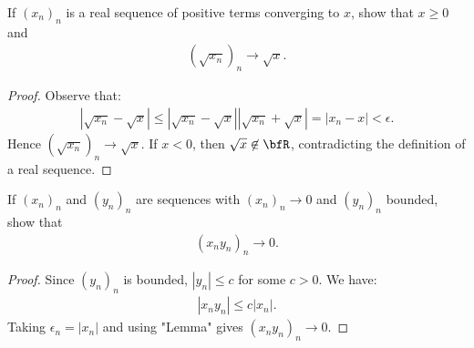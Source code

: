\documentclass[10pt,twoside,openany]{memoir}
\begin{document}
    \begin{exercise}
        If $(x_n)_n$ is a real sequence of positive terms converging to $x$, show that $x \geq 0$ and
            \begin{equation*}
            \begin{split}
                (\sqrt{x_n})_n \rightarrow \sqrt{x}.
            \end{split}
            \end{equation*}
        
            {\color{red} \begin{proof}
                Observe that:
                    \begin{equation*}
                    \begin{split}
                        \left|\sqrt{x_n} - \sqrt{x}\right| \leq \left|\sqrt{x_n}-\sqrt{x}\right|\left|\sqrt{x_n} + \sqrt{x}\right| = \left|x_n - x\right| < \epsilon.
                    \end{split}
                    \end{equation*}
                Hence $(\sqrt{x_n})_n \rightarrow \sqrt{x}$. If $x < 0$, then $\sqrt{x} \not\in \bfR$, contradicting the definition of a real sequence.
            \end{proof}}
    \end{exercise}
    \begin{exercise}
        If $(x_n)_n$ and $(y_n)_n$ are sequences with $(x_n)_n \rightarrow 0$ and $(y_n)_n$ bounded, show that
            \begin{equation*}
            \begin{split}
                (x_n y_n)_n \rightarrow 0.
            \end{split}
            \end{equation*}
    \end{exercise}
        {\color{red} \begin{proof}
            Since $(y_n)_n$ is bounded, $|y_n| \leq c$ for some $c > 0$. We have:
                \begin{equation*}
                \begin{split}
                    |x_n y_n| \leq c|x_n|.
                \end{split}
                \end{equation*}
            Taking $\epsilon_n = |x_n|$ and using "Lemma" gives $(x_n y_n)_n \rightarrow 0$.
        \end{proof}}
\end{document}
